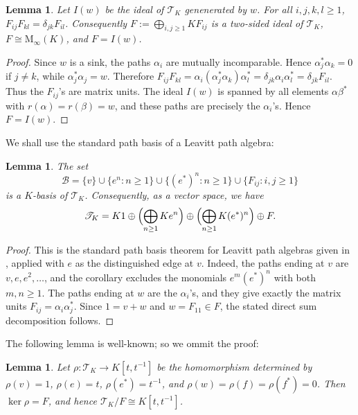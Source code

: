 \documentclass[11pt]{article}
\numberwithin{equation}{section}
\theoremstyle{plain}
\newtheorem{lemma}[theorem]{Lemma}
\theoremstyle{definition}
\numberwithin{equation}{section}
\newcommand{\T}{\mathscr T_K}
\newcommand{\M}{\mathrm M_\infty(K)}
\begin{document}
\begin{lemma}\label{lem:matrix-units}
Let $I(w)$ be the ideal of $\T$ genenerated by $w$. For all $i,j,k,l\geq1$, $F_{ij}F_{kl}=\delta_{jk}F_{il}$. Consequently $F:=\bigoplus_{i,j\geq1}KF_{ij}$ is a two-sided ideal of $\T$, $F\cong\M$, and $F=I(w)$.
\end{lemma}

\begin{proof}
Since $w$ is a sink, the paths $\alpha_i$ are mutually incomparable. Hence $\alpha_j^*\alpha_k=0$ if $j\neq k$, while $\alpha_j^*\alpha_j=w$. Therefore $F_{ij}F_{kl}=\alpha_i(\alpha_j^*\alpha_k)\alpha_l^*=\delta_{jk}\alpha_i\alpha_l^*=\delta_{jk}F_{il}$. Thus the $F_{ij}$'s are matrix units. The ideal $I(w)$ is spanned by all elements $\alpha\beta^*$ with $r(\alpha)=r(\beta)=w$, and these paths are precisely the $\alpha_i$'s. Hence $F=I(w)$.
\end{proof}

We shall use the standard path basis of a Leavitt path algebra:

\begin{lemma}\label{lem:path-basis}
The set
$$
        \mathcal B=\{v\}\cup\{e^n:n\geq1\}\cup\{(e^*)^n:n\geq1\}\cup\{F_{ij}:i,j\geq1\}
$$
is a $K$-basis of $\T$. Consequently, as a vector space, we have
$$
        \T=K1\oplus\Bigl(\bigoplus_{n\geq1}Ke^n\Bigr)\oplus\Bigl(\bigoplus_{n\geq1}K(e^*)^n\Bigr)\oplus F.
$$
\end{lemma}

\begin{proof}
This is the standard path basis theorem for Leavitt path algebras given in \cite[Corollary~1.5.12]{AbramsAraSiles}, applied with $e$ as the distinguished edge at $v$. Indeed, the paths ending at $v$ are $v,e,e^2,\ldots$, and the corollary excludes the monomials $e^m(e^*)^n$ with both $m,n\geq1$. The paths ending at $w$ are the $\alpha_i$'s, and they give exactly the matrix units $F_{ij}=\alpha_i\alpha_j^*$. Since $1=v+w$ and $w=F_{11}\in F$, the stated direct sum decomposition follows.
\end{proof}

The following lemma is well-known; so we ommit the proof:

\begin{lemma}\label{lem:quotient}
Let $\rho:\T\to K[t,t^{-1}]$ be the homomorphism determined by $\rho(v)=1$, $\rho(e)=t$, $\rho(e^*)=t^{-1}$, and $\rho(w)=\rho(f)=\rho(f^*)=0$. Then $\ker\rho=F$, and hence $\T/F\cong K[t,t^{-1}]$.
\end{lemma}
\end{document}
